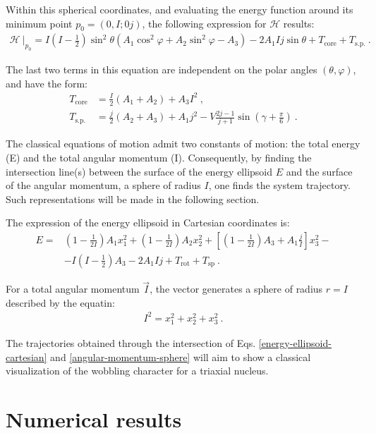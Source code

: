 \documentclass[11pt]{article}
\begin{document}
Within this spherical coordinates, and evaluating the energy function around its minimum point $p_0=(0,I;0j)$, the following expression for $\mathcal{H}$ results:
\begin{align}
    \left. \mathcal{H}\ \right\vert_{p_0}=I\left(I-\frac{1}{2}\right)\sin^2\theta(A_1\cos^2\varphi+A_2\sin^2\varphi-A_3)-2A_1Ij\sin\theta+T_\text{core}+T_\text{s.p.}\ .
    \label{energy-function-minimal}
\end{align}

The last two terms in this equation are independent on the polar angles $(\theta,\varphi)$, and  have the form:
\begin{align}
    T_\text{core}&=\frac{I}{2}(A_1+A_2)+A_3I^2\ ,\nonumber \\
    T_\text{s.p.}&=\frac{j}{2}(A_2+A_3)+A_1j^2-V\frac{2j-1}{j+1}\sin\left(\gamma+\frac{\pi}{6}\right)\ .
    \label{energyfunction-core-single-particle-subterms}
\end{align}

The classical equations of motion admit two constants of motion: the total energy (E) and the total angular momentum (I).  Consequently, by finding the intersection line(s) between the surface of the energy ellipsoid $E$ and the surface of the angular momentum, a sphere of radius  $I$, one finds the system trajectory.  Such representations will be made in the following section.

The expression of the energy ellipsoid in Cartesian coordinates is:
\begin{align}
    E=&\left(1-\frac{1}{2I}\right)A_1x_1^2+\left(1-\frac{1}{2I}\right)A_2x_2^2+\left[\left(1-\frac{1}{2I}\right)A_3+A_1\frac{j}{I}\right]x_3^2-\nonumber\\
    &-I\left(I-\frac{1}{2}\right)A_3-2A_1Ij+T_\text{rot}+T_\text{sp}\ .
    \label{energy-ellipsoid-cartesian}
\end{align}

 For a total angular momentum $\vec{I}$, the vector generates a sphere of radius $r=I$ described by the equatin:
\begin{align}
    I^2=x_1^2+x_2^2+x_3^2\ .
    \label{angular-momentum-sphere}
\end{align}

The trajectories obtained through the intersection of Eqs. \ref{energy-ellipsoid-cartesian} and \ref{angular-momentum-sphere} will aim to show a classical visualization of the wobbling character for a triaxial nucleus.

\section{Numerical results}
\label{section-results}
\end{document}
